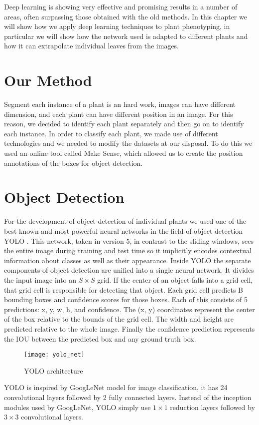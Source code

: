 



Deep learning is showing very effective and promising results in a number of areas, often surpassing those obtained with the old methods. In this chapter we will show
how we apply deep learning techniques to plant phenotyping, in particular we will show how the network used is adapted to different plants and how it can extrapolate
individual leaves from the images.

\section{Our Method}
Segment each instance of a plant is an hard work, images can have different dimension, and each plant can have different position in an image. For this reason, we decided
to identify each plant separately and then go on to identify each instance. In order to classify each plant, we made use of different technologies and we needed to modify
the datasets at our disposal. To do this we used an online tool called Make Sense, which allowed us to create the position annotations of the boxes for object detection.

\section{Object Detection}
For the development of object detection of individual plants we used one of the best known and most powerful neural networks in the field of object detection YOLO
\cite{redmon2016look}. This network, taken in version 5, in contrast to the sliding windows, sees the entire image during training and test time so it implicitly encodes
contextual information about classes as well as their appearance. Inside YOLO the separate components of object detection are unified into a single neural network.
It divides the input image into an $S \times S$ grid. If the center of an object falls into a grid cell, that grid cell is responsible for detecting that object.
Each grid cell predicts B bounding boxes and confidence scores for those boxes. Each of this consists of 5 predictions: x, y, w, h, and confidence. The (x, y)
coordinates represent the center of the box relative to the bounds of the grid cell. The width and height are predicted relative to the whole image. Finally
the confidence prediction represents the IOU between the predicted box and any ground truth box.
\begin{figure}[h]
    \centering
    \texttt{[image: yolo\_net]} 
    \caption{YOLO architecture}
\end{figure}
YOLO is inspired by GoogLeNet \cite{Szegedy_2015_CVPR} model for image classification, it has 24 convolutional layers followed by 2 fully connected layers.
Instead of the inception modules used by GoogLeNet, YOLO simply use $1 \times 1$ reduction layers followed by $3 \times 3$ convolutional layers.

